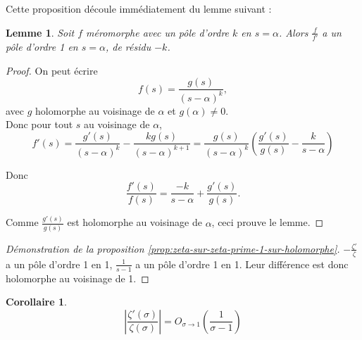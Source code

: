 \documentclass[french]{report}
\newtheorem{proposition}[theorem]{Proposition}
\newtheorem{corollary}[theorem]{Corollaire}
\newtheorem{lemma}[theorem]{Lemme}
\begin{document}
Cette proposition découle immédiatement du lemme suivant :

\begin{lemma}
  Soit $f$ méromorphe avec un pôle d'ordre $k$ en $s=\alpha$. Alors $\frac{f}{f'}$ a un pôle d'ordre 1 en $s=\alpha$, de résidu $-k$.
\end{lemma}

\begin{proof}
  On peut écrire
  \[ f(s) = \frac{g(s)}{(s-\alpha)^k},\]
  avec $g$ holomorphe au voisinage de $\alpha$ et $g(\alpha)\neq0$.
  \\

  Donc pour tout $s$ au voisinage de $\alpha$,
  \[
    f'(s)
    = \frac{g'(s)}{(s-\alpha)^k}-\frac{kg(s)}{(s-\alpha)^{k+1}}
    = \frac{g(s)}{(s-\alpha)^k}\left(\frac{g'(s)}{g(s)}-\frac{k}{s-\alpha}\right)
  \]

  Donc
  \[
    \frac{f'(s)}{f(s)} = \frac{-k}{s-\alpha}+\frac{g'(s)}{g(s)}.
  \]

  Comme $\frac{g'(s)}{g(s)}$ est holomorphe au voisinage de $\alpha$, ceci prouve le lemme.
\end{proof}

\begin{proof}[Démonstration de la proposition \ref{prop:zeta-sur-zeta-prime-1-sur-holomorphe}]
 $-\frac{\zeta'}{\zeta}$ a un pôle d'ordre 1 en 1, $\frac{1}{s-1}$ a un pôle d'ordre 1 en 1. Leur différence est donc holomorphe au voisinage de 1.
\end{proof}

\begin{corollary}\label{cor:zeta-sur-zeta-prime-o}
  \[ \left|\frac{\zeta'(\sigma)}{\zeta(\sigma)}\right| = O_{\sigma\to1}\left(\frac{1}{\sigma-1}\right) \]
\end{corollary}



\end{document}
